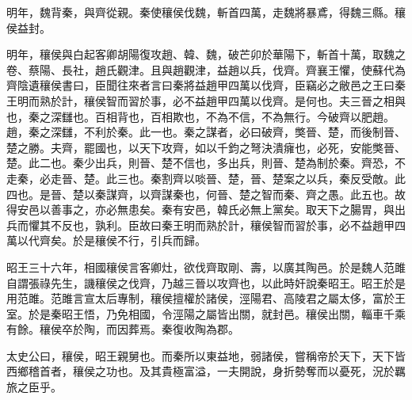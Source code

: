 明年，魏背秦，與齊從親。秦使穰侯伐魏，斬首四萬，走魏將暴鳶，得魏三縣。穰侯益封。

明年，穰侯與白起客卿胡陽復攻趙、韓、魏，破芒卯於華陽下，斬首十萬，取魏之卷、蔡陽、長社，趙氏觀津。且與趙觀津，益趙以兵，伐齊。齊襄王懼，使蘇代為齊陰遺穰侯書曰，臣聞往來者言曰秦將益趙甲四萬以伐齊，臣竊必之敝邑之王曰秦王明而熟於計，穰侯智而習於事，必不益趙甲四萬以伐齊。是何也。夫三晉之相與也，秦之深讎也。百相背也，百相欺也，不為不信，不為無行。今破齊以肥趙。趙，秦之深讎，不利於秦。此一也。秦之謀者，必曰破齊，獘晉、楚，而後制晉、楚之勝。夫齊，罷國也，以天下攻齊，如以千鈞之弩決潰癕也，必死，安能獘晉、楚。此二也。秦少出兵，則晉、楚不信也，多出兵，則晉、楚為制於秦。齊恐，不走秦，必走晉、楚。此三也。秦割齊以啖晉、楚，晉、楚案之以兵，秦反受敵。此四也。是晉、楚以秦謀齊，以齊謀秦也，何晉、楚之智而秦、齊之愚。此五也。故得安邑以善事之，亦必無患矣。秦有安邑，韓氏必無上黨矣。取天下之腸胃，與出兵而懼其不反也，孰利。臣故曰秦王明而熟於計，穰侯智而習於事，必不益趙甲四萬以代齊矣。於是穰侯不行，引兵而歸。

昭王三十六年，相國穰侯言客卿灶，欲伐齊取剛、壽，以廣其陶邑。於是魏人范雎自謂張祿先生，譏穰侯之伐齊，乃越三晉以攻齊也，以此時奸說秦昭王。昭王於是用范雎。范雎言宣太后專制，穰侯擅權於諸侯，涇陽君、高陵君之屬太侈，富於王室。於是秦昭王悟，乃免相國，令涇陽之屬皆出關，就封邑。穰侯出關，輜車千乘有餘。穰侯卒於陶，而因葬焉。秦復收陶為郡。

太史公曰，穰侯，昭王親舅也。而秦所以東益地，弱諸侯，嘗稱帝於天下，天下皆西鄉稽首者，穰侯之功也。及其貴極富溢，一夫開說，身折勢奪而以憂死，況於羈旅之臣乎。